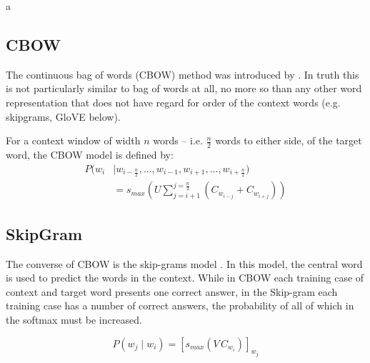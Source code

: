 \documentclass[parskip]{komatufte}
\begin{document}
 a


\subsection{CBOW}
The continuous bag of words (CBOW) method was introduced by .
In truth this is not particularly similar to bag of words at all, no more so than any other word representation that does not have regard for order of the context words (e.g. skipgrams, GloVE below).


For a context window of width $n$ words -- i.e. $\frac{n}{2}$ words to either side, of the target word,
the CBOW model is defined by:
\begin{align}
P(w_i & \mid w_{i-\frac{n}{2}},..., w_{i-1}, w_{i+1},...,w_{i+\frac{n}{2}})  \nonumber
\\  & = s_{max}(U \sum_{j=i+1}^{j=\frac{n}{2}} \left( C_{w_{i-j}}+C_{w_{i+j}} \right))
\end{align}







\subsection{SkipGram}



The converse of CBOW is the skip-grams model .
In this model, the central word is used to predict the words in the context.
While in CBOW each training case of context and target word presents one correct answer,
in the Skip-gram each training case has a number of correct answers, the probability of all of which in the softmax must be increased.

\begin{equation}
P(w_j \mid w_{i}) = \left[ s_{max}(V\,C_{w_{i}}) \right]_{w_j} 
\end{equation}
\end{document}
